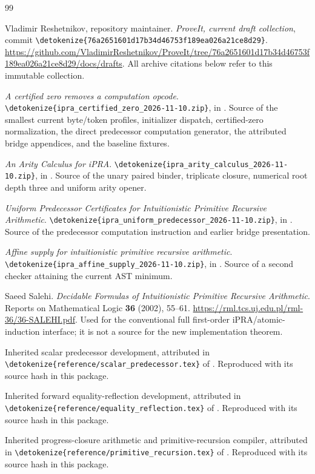 \documentclass[11pt,letterpaper]{article}
\theoremstyle{definition}\newtheorem{definition}[theorem]{Definition}
\theoremstyle{remark}\newtheorem{remark}[theorem]{Remark}
\newcommand{\file}[1]{\expandafter\nolinkurl\expandafter{\detokenize{#1}}}
\begin{document}
\clearpage
\begin{thebibliography}{99}\raggedright
{}
Vladimir Reshetnikov, repository maintainer.
\emph{ProveIt, current draft collection}, commit
\file{76a2651601d17b34d46753f189ea026a21ce8d29}.
\url{https://github.com/VladimirReshetnikov/ProveIt/tree/76a2651601d17b34d46753f189ea026a21ce8d29/docs/drafts}.
All archive citations below refer to this immutable collection.

\emph{A certified zero removes a computation opcode}.
\file{ipra_certified_zero_2026-11-10.zip}, in \cite{corpus}.
Source of the smallest current byte/token profiles, initializer dispatch,
certified-zero normalization, the direct predecessor computation
generator, the attributed bridge appendices, and the baseline fixtures.

\emph{An Arity Calculus for iPRA}.
\file{ipra_arity_calculus_2026-11-10.zip}, in \cite{corpus}.
Source of the unary paired binder, triplicate closure, numerical root
depth three and uniform arity opener.

\emph{Uniform Predecessor Certificates for Intuitionistic Primitive
Recursive Arithmetic}.
\file{ipra_uniform_predecessor_2026-11-10.zip}, in \cite{corpus}.
Source of the predecessor computation instruction and earlier bridge
presentation.

\emph{Affine supply for intuitionistic primitive recursive arithmetic}.
\file{ipra_affine_supply_2026-11-10.zip}, in \cite{corpus}.
Source of a second checker attaining the current AST minimum.

Saeed Salehi. \emph{Decidable Formulas of Intuitionistic Primitive
Recursive Arithmetic}. Reports on Mathematical Logic \textbf{36}
(2002), 55--61.
\url{https://rml.tcs.uj.edu.pl/rml-36/36-SALEHI.pdf}.
Used for the conventional full first-order iPRA/atomic-induction interface;
it is not a source for the new implementation theorem.

Inherited scalar predecessor development, attributed in
\file{reference/scalar_predecessor.tex} of \cite{certified}.
Reproduced with its source hash in this package.

Inherited forward equality-reflection development, attributed in
\file{reference/equality_reflection.tex} of \cite{certified}.
Reproduced with its source hash in this package.

Inherited progress-closure arithmetic and primitive-recursion compiler,
attributed in \file{reference/primitive_recursion.tex} of \cite{certified}.
Reproduced with its source hash in this package.
\end{thebibliography}
\end{document}

